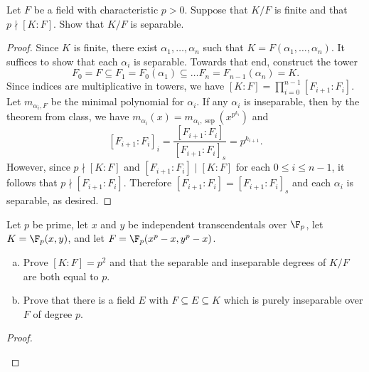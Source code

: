\documentclass[10pt]{amsart}
\begin{document}
\begin{thm}
  Let $F$ be a field with characteristic $p > 0$.
  Suppose that $K/F$ is finite and that $p \nmid [K : F]$.
  Show that $K/F$ is separable.
  \begin{proof}
    Since $K$ is finite, there exist $\alpha_1, \ldots, \alpha_n$ such that $K = F(\alpha_1, \ldots, \alpha_n)$.
    It suffices to show that each $\alpha_i$ is separable.
    Towards that end, construct the tower 
    $$F_0 = F \subseteq F_1 = F_0(\alpha_1) \subseteq \ldots F_n = F_{n-1}(\alpha_{n}) = K.$$
    Since indices are multiplicative in towers, we have $[K:F] = \prod_{i=0}^{n-1} [F_{i+1} : F_i]$.
    Let $m_{\alpha_i, F}$ be the minimal polynomial for $\alpha_i$.
    If any $\alpha_i$ is inseparable, then by the theorem from class, we have $m_{\alpha_i}(x) = m_{\alpha_i, \operatorname{sep}}(x^{p^{k_{i}}})$ and
    $$[F_{i+1} : F_i]_i = \frac{[F_{i+1} : F_{i}]}{[F_{i+1} : F_i]_s} = p^{k_{i+1}}.$$
    However, since $p \nmid [K : F]$ and $[F_{i+1} : F_i] \mid [K : F]$ for each $0 \leq i \leq n-1$, it follows that $p \nmid [F_{i+1} : F_i]$.
    Therefore $[F_{i+1} : F_i] = [F_{i+1} : F_i]_s$ and each $\alpha_i$ is separable, as desired.
  \end{proof}
\end{thm}

\begin{thm}
  Let $p$ be prime, let $x$ and $y$ be independent transcendentals over $\F_p$, let $K = \F_p(x,y)$, and let $F = \F_p(x^p - x, y^p - x)$.
  \begin{enumerate}[(a)]
  \item
    Prove $[K : F] = p^2$ and that the separable and inseparable degrees of $K/F$ are both equal to $p$.
  \item
    Prove that there is a field $E$ with $F \subseteq E \subseteq K$ which is purely inseparable over $F$ of degree $p$.
  \end{enumerate}

  \begin{proof}
    \begin{enumerate}[(a)]
    \end{enumerate}
  \end{proof}
\end{thm}
\end{document}
